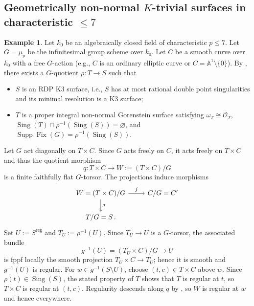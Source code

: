 \documentclass[reqno,oneside]{amsart}
\theoremstyle{definition}
\newtheorem{example}[theorem]{Example}
\theoremstyle{plain}
\numberwithin{equation}{section}
\begin{document}
\subsection{Geometrically non-normal $K$-trivial surfaces in characteristic $\le7$}\label{subsection-exam-non-normal-le7}%
\begin{example}\label{example-57}
  Let $k_0$ be an algebraically closed field of characteristic $p\le7$.
  Let $G=\mu_p$ be the infinitesimal group scheme over $k_0$.
  Let $C$ be a smooth curve over $k_0$ with a free $G$-action (e.g., $C$ is an ordinary elliptic curve or $C = \mathbb A^1\setminus \{0\}$).
  By \cite[Theorem~7.3 (2), Examples~10.2, 10.3, 10.7 and 10.8]{Matsumoto-2023-mu_p-alpha_p}, there exists a $G$-quotient $\rho\colon T\to S$ such that 
  \begin{itemize}
    \item $S$ is an RDP K3 surface, i.e., $S$ has at most rational double point singularities and its minimal resolution is a K3 surface; 
    \item $T$ is a proper integral non-normal Gorenstein surface satisfying $\omega_T \cong \mathcal{O}_T$, $\operatorname{Sing}(T) \cap \rho^{-1}(\operatorname{Sing}(S)) = \varnothing$, and
      $\operatorname{Supp}\operatorname{Fix}(G) = \rho^{-1}(\operatorname{Sing}(S))$.
  \end{itemize}
  Let $G$ act diagonally on $T \times C$.
  Since $G$ acts freely on $C$, it acts freely on $T\times C$ and thus the quotient morphism \[
    q\colon T \times C \longrightarrow W := (T \times C)/G
  \]
  is a finite faithfully flat $G$-torsor.
  The projections induce morphisms
  \[
    \begin{tikzcd}
      W = (T \times C)/G \rar{f}\dar{g} & C/G = C' \\
      T/G = S\,. &
    \end{tikzcd}
  \]
  Set $U := S^{\mathrm{reg}}$ and $T_U := \rho^{-1}(U)$.
  Since $T_U\to U$ is a $G$-torsor, the associated bundle
  \[
    g^{-1}(U) = (T_U \times C)/G \longrightarrow U
  \]
  is fppf locally the smooth projection $T_U \times C \to T_U$; hence it is smooth and $g^{-1}(U)$ is regular.
  For $w\in g^{-1}(S\setminus U)$, choose $(t,c)\in T\times C$ above $w$.
  Since $\rho(t)\in\operatorname{Sing}(S)$, the stated property of $T$ shows that $T$ is regular at $t$, so $T\times C$ is regular at $(t,c)$.
  Regularity descends along $q$ by \cite[\href{https://stacks.math.columbia.edu/tag/07NG}{Tag~07NG}]{stacks-project}, so $W$ is regular at $w$ and hence everywhere.


\end{example}
\end{document}
